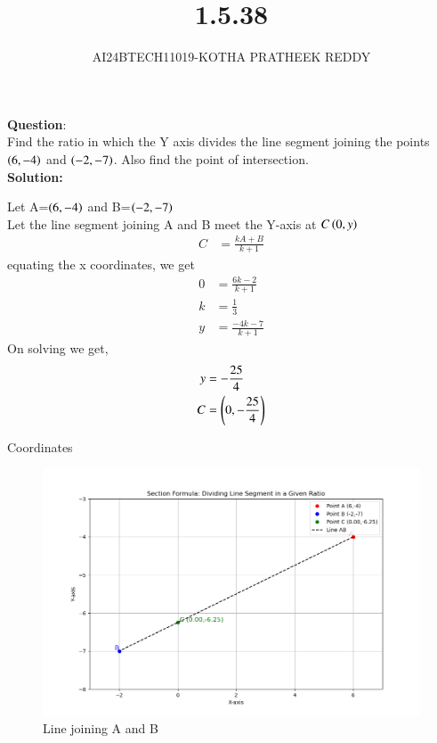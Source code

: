\documentclass[journal]{IEEEtran}
\begin{document}

\vspace{3cm}

\title{1.5.38}
\author{AI24BTECH11019-KOTHA PRATHEEK REDDY}

{\let\newpage\relax\maketitle}

\renewcommand{\thefigure}{\theenumi}
\renewcommand{\thetable}{\theenumi}
\setlength{\intextsep}{10pt} %


\renewcommand{\thetable}{\theenumi}


\textbf{Question}:\\  Find the ratio in which the Y axis divides the line segment joining the points $\left(6,-4\right)$
and $\left(-2,-7\right)$. Also find the point of intersection.
\\
\textbf{Solution:}

Let A=$\left(6,-4\right)$ and B=$\left(-2,-7\right)$\\
Let the line segment joining A and B meet the Y-axis at $C\left(0,y\right)$ \\

\begin{align}
    C &= \frac{kA+B}{k+1} 
   \end{align}
   equating the x coordinates, we get 
   \begin{align}
    0 &= \frac{6k - 2}{k + 1}  \\
    k &= \frac{1}{3}  \\
    y &= \frac{-4k - 7}{k + 1} 
\end{align}
  On solving we get,
  \begin{align}
	y &= -\frac{25}{4}  \\
	C &= \left(0,-\frac{25}{4}\right) 
  \end{align}
  \begin{table}[H]
      \centering
      
      \caption{Coordinates}
      \label{}
  \end{table}



  

  \begin{figure}[h!]
   \centering
   \includegraphics[width=0.7\linewidth]{Figures/Figure_1.png}
	  \caption{Line joining A and B}
   \label{stemplot}
\end{figure}

  
\end{document}
